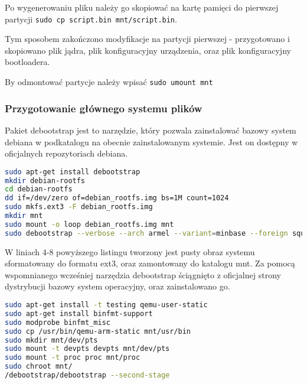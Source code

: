 Po wygenerowaniu pliku należy go skopiować na kartę pamięci do pierwszej partycji \lstinline|sudo cp script.bin mnt/script.bin|. 

Tym sposobem zakończono modyfikacje na partycji pierwszej - przygotowano i skopiowano plik jądra, plik konfiguracyjny urządzenia, oraz plik konfiguracyjny bootloadera. 

By odmontować partycje należy wpisać \lstinline|sudo umount mnt|

\subsubsection{Przygotowanie głównego systemu plików}

Pakiet debootstrap jest to narzędzie, który pozwala zainstalować bazowy system debiana w podkatalogu na obecnie zainstalowanym systemie. Jest on dostępny w oficjalnych repozytoriach debiana.

\begin{lstlisting}[language=bash]
sudo apt-get install debootstrap
mkdir debian-rootfs
cd debian-rootfs
dd if=/dev/zero of=debian_rootfs.img bs=1M count=1024
sudo mkfs.ext3 -F debian_rootfs.img
mkdir mnt
sudo mount -o loop debian_rootfs.img mnt
sudo debootstrap --verbose --arch armel --variant=minbase --foreign squeeze mnt http://ftp.debian.org/debian
\end{lstlisting}

W liniach 4-8 powyższego listingu tworzony jest pusty obraz systemu sformatowany do formatu ext3, oraz zamontowany do katalogu mnt. Za pomocą wspomnianego wcześniej narzędzia debootstrap ściągnięto z oficjalnej strony dystrybucji bazowy system operacyjny, oraz zainstalowano go.


\begin{lstlisting}[language=bash]
sudo apt-get install -t testing qemu-user-static
sudo apt-get install binfmt-support
sudo modprobe binfmt_misc
sudo cp /usr/bin/qemu-arm-static mnt/usr/bin
sudo mkdir mnt/dev/pts
sudo mount -t devpts devpts mnt/dev/pts
sudo mount -t proc proc mnt/proc
sudo chroot mnt/
/debootstrap/debootstrap --second-stage
\end{lstlisting}

